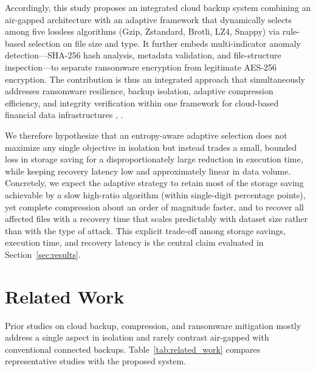 \documentclass{iaesarticle}
\begin{document}
Accordingly, this study proposes an integrated cloud backup system combining an air-gapped architecture with an adaptive framework that dynamically selects among five lossless algorithms (Gzip, Zstandard, Brotli, LZ4, Snappy) via rule-based selection on file size and type. It further embeds multi-indicator anomaly detection---SHA-256 hash analysis, metadata validation, and file-structure inspection---to separate ransomware encryption from legitimate AES-256 encryption. The contribution is thus an integrated approach that simultaneously addresses ransomware resilience, backup isolation, adaptive compression efficiency, and integrity verification within one framework for cloud-based financial data infrastructures \cite{19}, \cite{20}.

We therefore hypothesize that an entropy-aware adaptive selection does not maximize any single objective in isolation but instead trades a small, bounded loss in storage saving for a disproportionately large reduction in execution time, while keeping recovery latency low and approximately linear in data volume. Concretely, we expect the adaptive strategy to retain most of the storage saving achievable by a slow high-ratio algorithm (within single-digit percentage points), yet complete compression about an order of magnitude faster, and to recover all affected files with a recovery time that scales predictably with dataset size rather than with the type of attack. This explicit trade-off among storage savings, execution time, and recovery latency is the central claim evaluated in Section~\ref{sec:results}.

\section{Related Work}
\label{sec:related_work}
Prior studies on cloud backup, compression, and ransomware mitigation mostly address a single aspect in isolation and rarely contrast air-gapped with conventional connected backups. Table~\ref{tab:related_work} compares representative studies with the proposed system.
\end{document}
